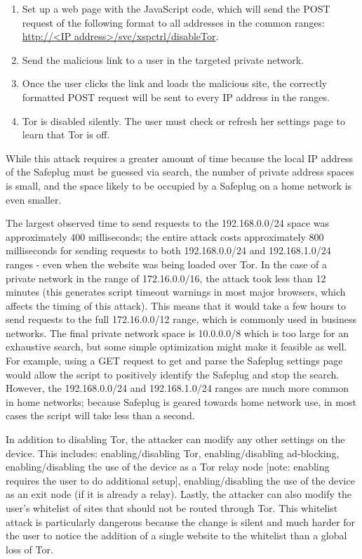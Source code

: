 \documentclass[letterpaper,twocolumn,10pt]{article}
\begin{document}
\begin{enumerate} \setlength{\itemsep}{.2mm}
\item Set up a web page with the JavaScript code, which will send the POST request of the following format to all addresses in the common ranges: \url{http://<IP address>/svc/xspctrl/disableTor}.
\item Send the malicious link to a user in the targeted private network.
\item Once the user clicks the link and loads the malicious site, the correctly formatted POST request will be sent to every IP address in the ranges.  
\item Tor is disabled silently.  The user must check or refresh her settings page to learn that Tor is off.  
\end{enumerate}  

While this attack requires a greater amount of time because the local IP address of the Safeplug must be guessed via search, the number of private address spaces is small, and the space likely to be occupied by a Safeplug on a home network is even smaller.  

The largest observed time to send requests to the 192.168.0.0/24 space was approximately 400 milliseconds; the entire attack costs approximately 800 milliseconds for sending requests to both 192.168.0.0/24 and 192.168.1.0/24 ranges - even when the website was being loaded over Tor.  In the case of a private network in the range of 172.16.0.0/16, the attack took less than 12 minutes (this generates script timeout warnings in most major browsers, which affects the timing of this attack).  This means that it would take a few hours to send requests to the full 172.16.0.0/12 range, which is commonly used in business networks.  The final private network space is 10.0.0.0/8 which is too large for an exhaustive search, but some simple optimization might make it feasible as well.  For example, using a GET request to get and parse the Safeplug settings page would allow the script to positively identify the Safeplug and stop the search.  However, the 192.168.0.0/24 and 192.168.1.0/24 ranges are much more common in home networks; because Safeplug is geared towards home network use, in most cases the script will take less than a second.

In addition to disabling Tor, the attacker can modify any other settings on the device.  This includes: enabling/disabling Tor, enabling/disabling ad-blocking, enabling/disabling the use of the device as a Tor relay node [note: enabling requires the user to do additional setup], enabling/disabling the use of the device as an exit node (if it is already a relay).  Lastly, the attacker can also modify the user's whitelist of sites that should not be routed through Tor.  This whitelist attack is particularly dangerous because the change is silent and much harder for the user to notice the addition of a single website to the whitelist than a global loss of Tor.
\end{document}
